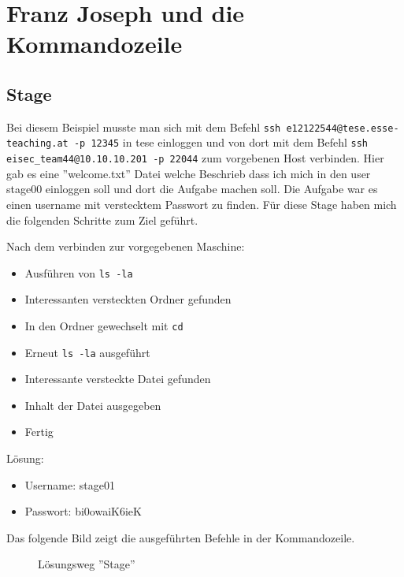 \documentclass[12pt,a4paper,titlepage,oneside]{scrartcl}
\begin{document}
\section{Franz Joseph und die Kommandozeile}

\subsection{Stage}
Bei diesem Beispiel musste man sich mit dem Befehl \lstinline{ssh e12122544@tese.esse-teaching.at -p 12345} in tese einloggen und von dort mit dem Befehl \lstinline{ssh eisec_team44@10.10.10.201 -p 22044} zum vorgebenen Host verbinden. Hier gab es eine ''welcome.txt'' Datei welche Beschrieb dass ich mich in den user stage00 einloggen soll und dort die Aufgabe machen soll. Die Aufgabe war es einen username mit verstecktem Passwort zu finden. Für diese Stage haben mich die folgenden Schritte zum Ziel geführt.

Nach dem verbinden zur vorgegebenen Maschine:
\begin{itemize}
  \item Ausführen von \lstinline{ls -la}
  \item Interessanten versteckten Ordner gefunden 
  \item In den Ordner gewechselt mit \lstinline{cd}
  \item Erneut \lstinline{ls -la} ausgeführt
  \item Interessante versteckte Datei gefunden
  \item Inhalt der Datei ausgegeben
  \item Fertig
\end{itemize}
  
Lösung: 
\begin{itemize} 
  \item Username: stage01
  \item Passwort: bi0owaiK6ieK
\end{itemize}
Das folgende Bild zeigt die ausgeführten Befehle in der Kommandozeile.
  \begin{figure}[h!]
    \centering
    \caption{Lösungsweg ''Stage''}
    \label{fig:stage_solution}
  \end{figure}
\end{document}
